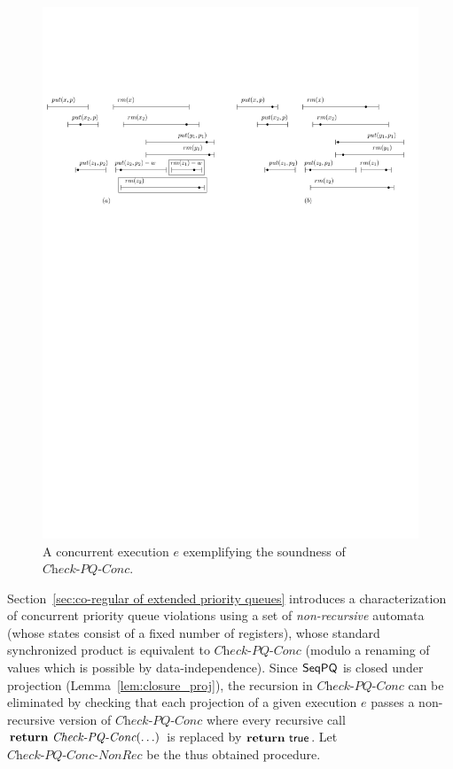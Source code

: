 \documentclass[a4paper,UKenglish]{lipics-v2016}
\begin{document}
\begin{figure}[t]
  \centering
  \includegraphics[width=.8\textwidth]{PIC-HIS-EPQ1-TwoHis-2.pdf}
  \caption{A concurrent execution $e$ exemplifying the soundness of $\textit{Check-PQ-Conc}$.}
  \label{fig:concurrent execution for EPQ1}
\end{figure}




Section~\ref{sec:co-regular of extended priority queues} introduces a characterization of concurrent priority queue violations using a set of \emph{non-recursive} automata (whose states consist of a fixed number of registers), whose standard synchronized product is equivalent to $\textit{Check-PQ-Conc}$ (modulo a renaming of values which is possible by data-independence). Since $\mathsf{SeqPQ}$ is closed under projection (Lemma~\ref{lem:closure_proj}), the recursion in $\textit{Check-PQ-Conc}$ can be eliminated by checking that each projection of a given execution $e$ passes a non-recursive version of $\textit{Check-PQ-Conc}$ where every recursive call $\text{{\bf return}}\ \textit{Check-PQ-Conc}(\ldots)$ is 
replaced by  $\text{{\bf return}}\ \mathsf{true}$. Let $\textit{Check-PQ-Conc-NonRec}$ be the thus obtained procedure.
\end{document}

